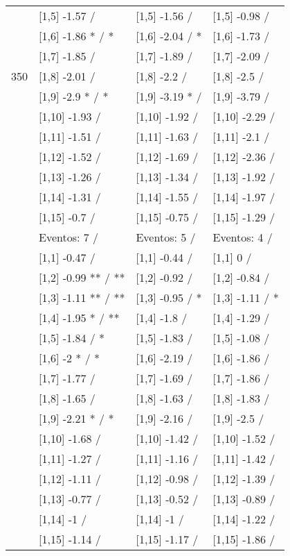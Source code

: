 \begin{table}
\begin{tabular}[t]{llll}
 & {}[1,5] -1.57  / & {}[1,5] -1.56  / & {}[1,5] -0.98  /\\
 & {}[1,6] -1.86 * / * & {}[1,6] -2.04  / * & {}[1,6] -1.73  /\\
 & {}[1,7] -1.85  / & {}[1,7] -1.89  / & {}[1,7] -2.09  /\\
350 & {}[1,8] -2.01  / & {}[1,8] -2.2  / & {}[1,8] -2.5  /\\
\addlinespace
 & {}[1,9] -2.9 * / * & {}[1,9] -3.19 * / & {}[1,9] -3.79  /\\
 & {}[1,10] -1.93  / & {}[1,10] -1.92  / & {}[1,10] -2.29  /\\
 & {}[1,11] -1.51  / & {}[1,11] -1.63  / & {}[1,11] -2.1  /\\
 & {}[1,12] -1.52  / & {}[1,12] -1.69  / & {}[1,12] -2.36  /\\
 & {}[1,13] -1.26  / & {}[1,13] -1.34  / & {}[1,13] -1.92  /\\
\addlinespace
 & {}[1,14] -1.31  / & {}[1,14] -1.55  / & {}[1,14] -1.97  /\\
 & {}[1,15] -0.7  / & {}[1,15] -0.75  / & {}[1,15] -1.29  /\\
 & Eventos:  7 / & Eventos:  5 / & Eventos:  4 /\\
 & {}[1,1] -0.47  / & {}[1,1] -0.44  / & {}[1,1] 0  /\\
 & {}[1,2] -0.99 ** / ** & {}[1,2] -0.92  / & {}[1,2] -0.84  /\\
\addlinespace
 & {}[1,3] -1.11 ** / ** & {}[1,3] -0.95  / * & {}[1,3] -1.11  / *\\
 & {}[1,4] -1.95 * / ** & {}[1,4] -1.8  / & {}[1,4] -1.29  /\\
 & {}[1,5] -1.84  / * & {}[1,5] -1.83  / & {}[1,5] -1.08  /\\
 & {}[1,6] -2 * / * & {}[1,6] -2.19  / & {}[1,6] -1.86  /\\
 & {}[1,7] -1.77  / & {}[1,7] -1.69  / & {}[1,7] -1.86  /\\
\addlinespace
500 & {}[1,8] -1.65  / & {}[1,8] -1.63  / & {}[1,8] -1.83  /\\
 & {}[1,9] -2.21 * / * & {}[1,9] -2.16  / & {}[1,9] -2.5  /\\
 & {}[1,10] -1.68  / & {}[1,10] -1.42  / & {}[1,10] -1.52  /\\
 & {}[1,11] -1.27  / & {}[1,11] -1.16  / & {}[1,11] -1.42  /\\
 & {}[1,12] -1.11  / & {}[1,12] -0.98  / & {}[1,12] -1.39  /\\
\addlinespace
 & {}[1,13] -0.77  / & {}[1,13] -0.52  / & {}[1,13] -0.89  /\\
 & {}[1,14] -1  / & {}[1,14] -1  / & {}[1,14] -1.22  /\\
 & {}[1,15] -1.14  / & {}[1,15] -1.17  / & {}[1,15] -1.86  /\\
\bottomrule
\end{tabular}
\end{table}
